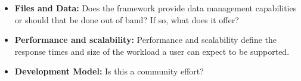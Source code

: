\documentclass{sig-alternate}
\begin{document}
\begin{itemize}
\item \textbf{Files and Data:} Does the framework provide data
  management capabilities or should that be done out of band? If so, what does
  it offer?

\item \textbf{Performance and scalability:}
  Performance and scalability define the response times and size of the
  workload a user can expect to be supported.

\item \textbf{Development Model:}
  Is this a community effort?

\end{itemize}
\end{document}
